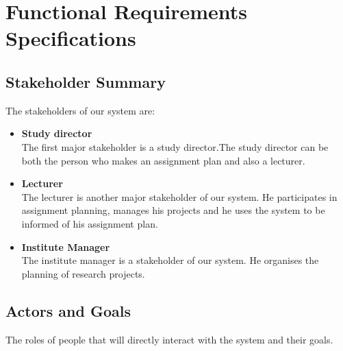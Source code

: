 \documentclass{scrartcl}
\begin{document}
   

        
     


\section{Functional Requirements Specifications}
 	\subsection{Stakeholder Summary}
 	The stakeholders of our system are:
  	\begin{itemize}
  	\item \textbf{ Study director}\\
  	The first major stakeholder is a study director.The study director can be both the person who makes an assignment plan and also a lecturer. 
  	
  	\item  \textbf{ Lecturer} \\
  	The lecturer is another major stakeholder of our system. He participates in assignment planning, manages his projects and he uses the system to be informed of his assignment plan.
  	
  	\item  \textbf{ Institute Manager} \\
  	The institute manager is a stakeholder of our system. He organises the planning of research projects.
  	\end{itemize}
  	
  	\subsection{Actors and Goals}
  	The roles of people that will directly interact with the system and their goals.
  	
\end{document}
